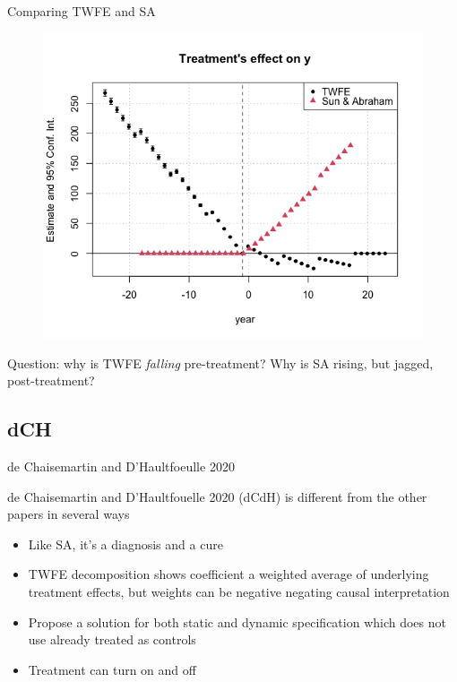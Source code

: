 \documentclass{beamer}
\begin{document}
\begin{frame}{Comparing TWFE and SA }

\begin{figure}
\begin{center}
             \includegraphics[scale=0.4]{./lecture_includes/twfe_sa_event}
\end{center}
\end{figure}

Question: why is TWFE \emph{falling} pre-treatment?  Why is SA rising, but jagged, post-treatment?

\end{frame}

\subsection{dCH}

\begin{frame}{de Chaisemartin and D'Haultfoeulle 2020}

de Chaisemartin and D'Haultfouelle 2020 (dCdH) is different from the other papers in several ways
	\begin{itemize}
	\item Like SA, it's a diagnosis and a cure
	\item TWFE decomposition shows coefficient a weighted average of underlying treatment effects, but weights can be negative negating causal interpretation
	\item Propose a solution for both static and dynamic specification which does not use already treated as controls
	\item Treatment can turn on and off
	\end{itemize}

\end{frame}
\end{document}

